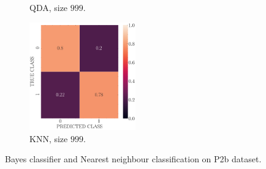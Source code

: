 \documentclass[12pt, a4 paper]{article}
\begin{document}
\begin{figure}[!htbp]
\begin{subfigure}[!htbp]{0.24\textwidth}
       \caption{QDA, size $999$.}
       \label{fig:QDA_rr20_P2b_999}
    \end{subfigure}
\quad \quad
    \begin{subfigure}[!htbp]{0.24\textwidth}
       \centering
       \includegraphics[width=1.8in]{../results/ex2/conf_mtx_KNN_dataset_P2b_size_999.pdf}
       \caption{KNN, size $999$.}
       \label{fig:KNN_rr20_P2b_999}
    \end{subfigure}
\caption{Bayes classifier and Nearest neighbour classification on P2b dataset.}
\label{fig:ex2P2b}
\end{figure}
\end{document}
